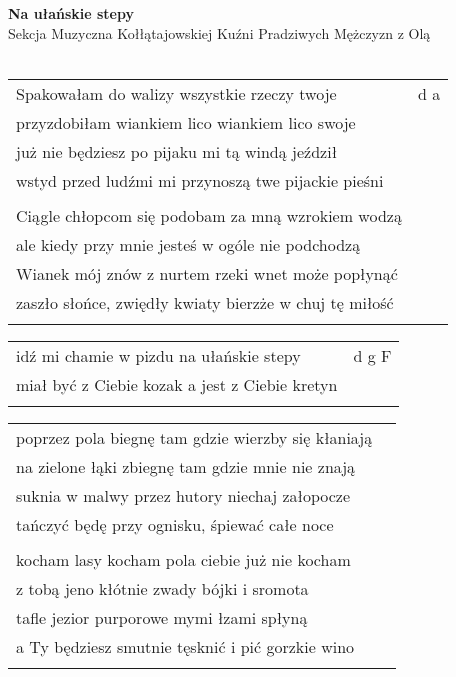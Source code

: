 \documentclass[a5paper]{article}
\begin{document}


\noindent
\fontsize{12pt}{15pt}\selectfont
\textbf{Na ułańskie stepy} \\
\fontsize{8pt}{10pt}\selectfont
Sekcja Muzyczna Kołłątajowskiej Kuźni Pradziwych Mężczyzn z Olą \\ \\
\fontsize{10pt}{12pt}\selectfont
{}
\begin{tabular}{@{}p{9.00cm}p{3cm}@{}}
\noindent
Spakowałam do walizy wszystkie rzeczy twoje & d a \\
przyzdobiłam wiankiem lico wiankiem lico swoje \\
już nie będziesz po pijaku mi tą windą jeździł \\
wstyd przed ludźmi mi przynoszą twe pijackie pieśni \\ \\

Ciągle chłopcom się podobam za mną wzrokiem wodzą\\
ale kiedy przy mnie jesteś w ogóle nie podchodzą\\
Wianek mój znów z nurtem rzeki wnet może popłynąć\\
zaszło słońce, zwiędły kwiaty bierzże w chuj tę miłość\\\\
\end{tabular}

\noindent
\begin{tabular}{@{}p{8.00cm}p{3cm}@{}}
idź mi chamie w pizdu na ułańskie stepy & d g F \\
miał być z Ciebie kozak a jest z Ciebie kretyn \\ \\
\end{tabular}

\noindent
\begin{tabular}{@{}p{8.00cm}p{3cm}@{}}
poprzez pola biegnę tam gdzie wierzby się kłaniają \\
na zielone łąki zbiegnę tam gdzie mnie nie znają\\
suknia w malwy przez hutory niechaj załopocze\\
tańczyć będę przy ognisku, śpiewać całe noce\\\\

kocham lasy kocham pola ciebie już nie kocham\\
z tobą jeno kłótnie zwady bójki i sromota\\
tafle jezior purporowe mymi łzami spłyną\\
a Ty będziesz smutnie tęsknić i pić gorzkie wino\\\\
\end{tabular}
\end{document}
